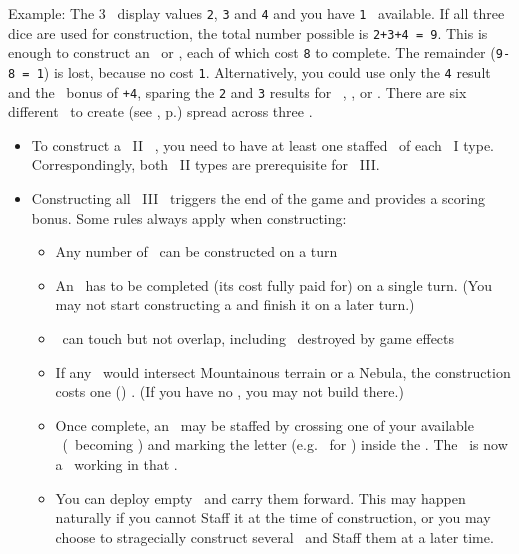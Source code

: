 Example: The 3 \whitedice\ display values \texttt{2}, \texttt{3} and \texttt{4} and you have \texttt{1} \greatperson\ available.  
If all three dice are used for construction, the total number possible is \texttt{2+3+4 = 9}.  
This is enough to construct an \academy\ or \factory, each of which cost \texttt{8} to complete.  
The remainder (\texttt{9-8 = 1}) is lost, because no \armaments cost \texttt{1}. 
Alternatively, you could use only the \texttt{4} result and the \greatperson\ bonus of \texttt{+4}, sparing the \texttt{2} and \texttt{3} results for \activating\ \armaments, \trade, or \culture.
\newline\newline
There are six different \armaments\ to create (see , p.\pageref{sec:armaments}) spread across three \levels.
\begin{itemize}
	\item To construct a \level\ II \armament\ , you need to have at least one staffed \armament\ of each \level\ I type.  Correspondingly, both \level\ II types are prerequisite for \level\ III.
	\item Constructing all \level\ III \armaments\ triggers the end of the game and provides a scoring bonus.  Some rules always apply when constructing:
  \begin{itemize}
    \item Any number of \armaments\ can be constructed on a turn
    \item An \armament\ has to be completed (its cost fully paid for) on a single turn. (You may not start constructing a \armament and finish it on a later turn.)
    \item \armaments\ can touch but not overlap, including \armaments\ destroyed by game effects
    \item If any \armaments\ would intersect Mountainous terrain or a Nebula, the construction costs one (\spendcurrency) \currency. (If you have no \currency, you may not build there.)
    \item Once complete, an \armament\ may be staffed by crossing one of your available \astronauts\ (\gainastronautsymbol\ becoming \useastronautsymbol) and marking the letter (e.g. \academysymbol\ for \academy) inside the \armament. The \astronaut\ is now a \specialist\ working in that \armament.
    \item You can deploy empty \armaments\ and carry them forward.  This may happen naturally if you cannot Staff it at the time of construction, or you may choose to stragecially construct several \armaments\ and Staff them at a later time.

\end{itemize}
\end{itemize}
